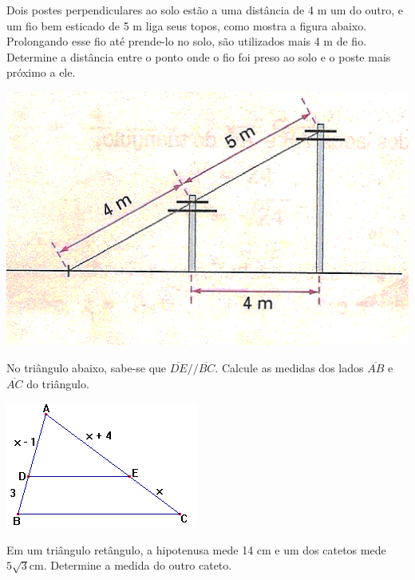 	\item Dois postes perpendiculares ao solo estão a uma distância de 4 m um do outro, e um fio bem esticado de 5 m liga seus topos, como mostra a figura abaixo. Prolongando esse fio até prende-lo no solo, são utilizados mais 4 m de fio. Determine a distância entre o ponto onde o fio foi preso ao solo e o poste mais próximo a ele.
	\begin{center}
	\includegraphics[scale=0.5]{figuras/fig64.png}
	\end{center}
	
	\item No triângulo abaixo, sabe-se que $\overline{DE} // \overline{BC}$. Calcule as medidas dos lados  $\overline{AB}$ e $\overline{AC}$ do triângulo.
	\begin{center}
	\includegraphics[scale=0.7]{figuras/fig65.png}
	\end{center}
	
	\item Em um triângulo retângulo, a hipotenusa mede 14 cm e um dos catetos mede $5\sqrt{3}$cm. Determine a medida do outro cateto.

